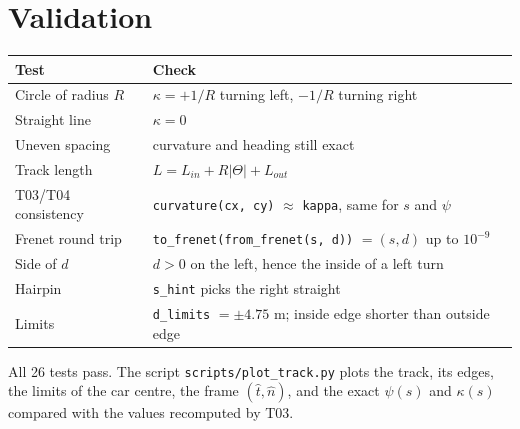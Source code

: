 \documentclass[11pt,a4paper]{article}
\newcommand{\code}[1]{\texttt{#1}}
\begin{document}
\section{Validation}
\begin{center}
\begin{tabular}{@{}ll@{}}
\toprule
\textbf{Test} & \textbf{Check} \\
\midrule
Circle of radius $R$ & $\kappa = +1/R$ turning left, $-1/R$ turning right \\
Straight line & $\kappa = 0$ \\
Uneven spacing & curvature and heading still exact \\
Track length & $L = L_{in} + R|\Theta| + L_{out}$ \\
T03/T04 consistency & \code{curvature(cx, cy)} $\approx$ \code{kappa}, same for $s$ and $\psi$ \\
Frenet round trip & \code{to\_frenet(from\_frenet(s, d))} $=(s,d)$ up to $10^{-9}$ \\
Side of $d$ & $d>0$ on the left, hence the inside of a left turn \\
Hairpin & \code{s\_hint} picks the right straight \\
Limits & \code{d\_limits} $= \pm4.75$ m; inside edge shorter than outside edge \\
\bottomrule
\end{tabular}
\end{center}
All 26 tests pass. The script \code{scripts/plot\_track.py} plots the track, its edges, the
limits of the car centre, the frame $(\hat t,\hat n)$, and the exact $\psi(s)$ and $\kappa(s)$
compared with the values recomputed by T03.
\end{document}
